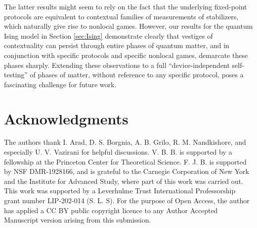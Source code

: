 \documentclass[prb,twocolumn,showpacs,amssymb,superscriptaddress]{revtex4-2}
\begin{document}
The latter results might seem to rely on the fact that the underlying fixed-point protocols are equivalent to contextual families of measurements of stabilizers, which naturally give rise to nonlocal games\cite{Abramsky2017}. However, our results for the quantum Ising model in Section \ref{sec:Ising} demonstrate clearly that vestiges of contextuality can persist through entire phases of quantum matter, and in conjunction with specific protocols and specific nonlocal games, demarcate these phases sharply. Extending these observations to a full ``device-independent self-testing'' of phases of matter, without reference to any specific protocol\cite{SelfTest,DeviceIndependent,SelfTestVaz,MagicSelfTesting,Grilo}, poses a fascinating challenge for future work.

\section{Acknowledgments}
The authors thank I. Arad, D. S. Borgnia, A. B. Grilo, R. M. Nandkishore, and especially U. V. Vazirani for helpful discussions. V. B. B. is supported by a fellowship at the Princeton Center for Theoretical Science. F. J. B. is supported by NSF DMR-1928166, and is grateful to the Carnegie Corporation of New York and the Institute for Advanced Study, where part of this work was carried out. This work was supported by a Leverhulme Trust International Professorship grant number LIP-202-014 (S. L. S). For the purpose of Open Access, the author has applied a CC BY public copyright licence to any Author Accepted Manuscript version arising from this submission.


\clearpage
\onecolumngrid
\appendix
\end{document}
